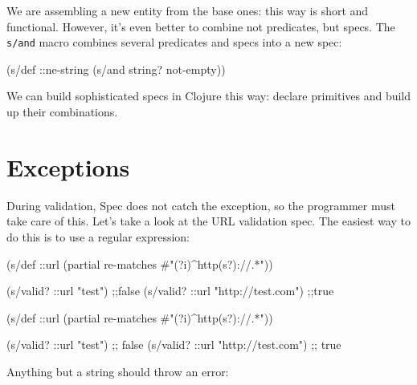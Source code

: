 
We are assembling a new entity from the base ones: this way is short and functional. However, it's even better to combine not predicates, but specs. The \verb|s/and| macro combines several predicates and specs into a new spec:

\begin{english}
  \begin{clojure}
(s/def ::ne-string
  (s/and string? not-empty))
  \end{clojure}
\end{english}

We can build sophisticated specs in Clojure this way: declare primitives and build up their combinations.

\section{Exceptions}


During validation, Spec does not catch the exception, so the programmer must take care of this. Let's take a look at the URL validation spec. The easiest way to do this is to use a regular expression:


\ifx\DEVICETYPE\MOBILE

\begin{english}
  \begin{clojure}
(s/def ::url
  (partial
    re-matches #"(?i)^http(s?)://.*"))

(s/valid? ::url "test") ;;false
(s/valid? ::url "http://test.com") ;;true
  \end{clojure}
\end{english}

\else

\begin{english}
  \begin{clojure}
(s/def ::url
  (partial re-matches #"(?i)^http(s?)://.*"))

(s/valid? ::url "test")            ;; false
(s/valid? ::url "http://test.com") ;; true
  \end{clojure}
\end{english}

\fi

Anything but a string should throw an error:


